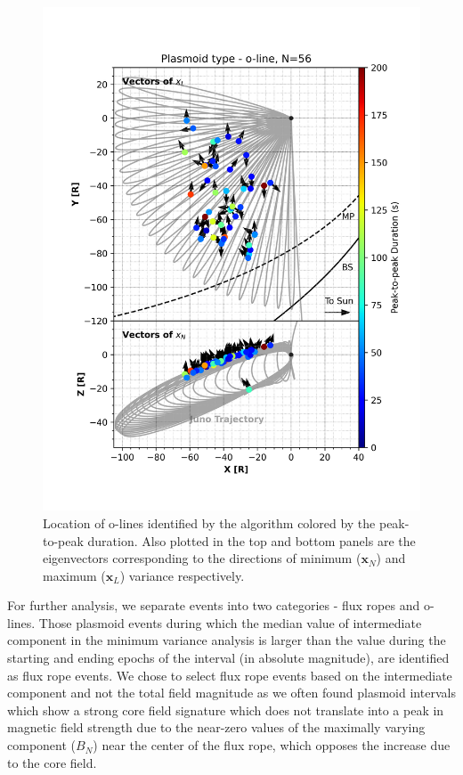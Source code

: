 \begin{figure}
    \centering
    \includegraphics{images6/TrajectoryLocationofEvent_quiver_o-line.png}
    \caption{Location of o-lines identified by the algorithm colored by the peak-to-peak duration. Also plotted in the top and bottom panels are the eigenvectors corresponding to the directions of minimum ($\mathbf{x}_N$) and maximum ($\mathbf{x}_L$) variance respectively.}
    \label{fig:trajectory-quiver-olines}
\end{figure}

For further analysis, we separate events into two categories - flux ropes and o-lines. Those plasmoid events during which the median value of intermediate component in the minimum variance analysis is larger than the value during the starting and ending epochs of the interval (in absolute magnitude), are identified as flux rope events. We chose to select flux rope events based on the intermediate component and not the total field magnitude as we often found plasmoid intervals which show a strong core field signature which does not translate into a peak in magnetic field strength due to the near-zero values of the maximally varying component ($B_N$) near the center of the flux rope, which opposes the increase due to the core field. 

